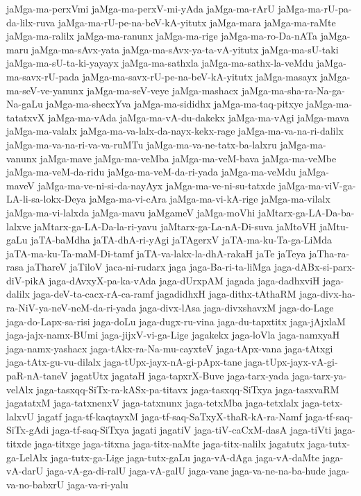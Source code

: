 {jaMga-ma-perxVmi
jaMga-ma-perxV-mi-yAda
jaMga-ma-rArU
jaMga-ma-rU-pa-da-lilx-ruva
jaMga-ma-rU-pe-na-beV-kA-yitutx
jaMga-mara
jaMga-ma-raMte
jaMga-ma-ralilx
jaMga-ma-ranunx
jaMga-ma-rige
jaMga-ma-ro-Da-nATa
jaMga-maru
jaMga-ma-sAvx-yata
jaMga-ma-sAvx-ya-ta-vA-yitutx
jaMga-ma-sU-taki
jaMga-ma-sU-ta-ki-yayayx
jaMga-ma-sathxla
jaMga-ma-sathx-la-veMdu
jaMga-ma-savx-rU-pada
jaMga-ma-savx-rU-pe-na-beV-kA-yitutx
jaMga-masayx
jaMga-ma-seV-ve-yanunx
jaMga-ma-seV-veye
jaMga-mashacx
jaMga-ma-sha-ra-Na-ga-Na-gaLu
jaMga-ma-shecxYva
jaMga-ma-sididhx
jaMga-ma-taq-pitxye
jaMga-ma-tatatxvX
jaMga-ma-vAda
jaMga-ma-vA-du-dakekx
jaMga-ma-vAgi
jaMga-mava
jaMga-ma-valalx
jaMga-ma-va-lalx-da-nayx-kekx-rage
jaMga-ma-va-na-ri-dalilx
jaMga-ma-va-na-ri-va-va-ruMTu
jaMga-ma-va-ne-tatx-ba-lalxru
jaMga-ma-vanunx
jaMga-mave
jaMga-ma-veMba
jaMga-ma-veM-bava
jaMga-ma-veMbe
jaMga-ma-veM-da-ridu
jaMga-ma-veM-da-ri-yada
jaMga-ma-veMdu
jaMga-maveV
jaMga-ma-ve-ni-si-da-nayAyx
jaMga-ma-ve-ni-su-tatxde
jaMga-ma-viV-ga-LA-li-sa-lokx-Deya
jaMga-ma-vi-cAra
jaMga-ma-vi-kA-rige
jaMga-ma-vilalx
jaMga-ma-vi-lalxda
jaMga-mavu
jaMgameV
jaMga-moVhi
jaMtarx-ga-LA-Da-ba-lalxve
jaMtarx-ga-LA-Da-la-ri-yavu
jaMtarx-ga-La-nA-Di-suva
jaMtoVH
jaMtu-gaLu
jaTA-baMdha
jaTA-dhA-ri-yAgi
jaTAgerxV
jaTA-ma-ku-Ta-ga-LiMda
jaTA-ma-ku-Ta-maM-Di-tamf
jaTA-va-lakx-la-dhA-rakaH
jaTe
jaTeya
jaTha-ra-rasa
jaThareV
jaTiloV
jaca-ni-rudarx
jaga
jaga-Ba-ri-ta-liMga
jaga-dABx-si-parx-diV-pikA
jaga-dAvxyX-pa-ka-vAda
jaga-dUrxpAM
jagada
jaga-dadhxviH
jaga-dalilx
jaga-deV-ta-cacx-rA-ca-ramf
jagadidhxH
jaga-dithx-tAthaRM
jaga-divx-ha-ra-NiV-ya-neV-neM-da-ri-yada
jaga-divx-lAsa
jaga-divxshavxM
jaga-do-Lage
jaga-do-Lapx-sa-risi
jaga-doLu
jaga-dugx-ru-vina
jaga-du-tapxtitx
jaga-jAjxlaM
jaga-jajx-namx-BUmi
jaga-jijxV-vi-ga-Lige
jagakekx
jaga-loVla
jaga-namxyaH
jaga-namx-yashacx
jaga-tAkx-ra-Na-mu-cayxteV
jaga-tApx-vana
jaga-tAtxgi
jaga-tAtx-gu-vu-dilalx
jaga-tUpx-jayx-nA-gi-pApx-tane
jaga-tUpx-jayx-vA-gi-paR-nA-taneV
jagatUtx
jagataH
jaga-tapxrX-Buve
jaga-tarx-yada
jaga-tarx-ya-velAlx
jaga-tasxqq-SiTx-ra-kASx-pa-titavx
jaga-tasxqq-SiTxya
jaga-tasxvaRM
jagatatxM
jaga-tatxnenxV
jaga-tatxnunx
jaga-tetxMba
jaga-tetxlalx
jaga-tetx-lalxvU
jagatf
jaga-tf-kaqtayxM
jaga-tf-saq-SaTxyX-thaR-kA-ra-Namf
jaga-tf-saq-SiTx-gAdi
jaga-tf-saq-SiTxya
jagati
jagatiV
jaga-tiV-caCxM-dasA
jaga-tiVti
jaga-titxde
jaga-titxge
jaga-titxna
jaga-titx-naMte
jaga-titx-nalilx
jagatutx
jaga-tutx-ga-LelAlx
jaga-tutx-ga-Lige
jaga-tutx-gaLu
jaga-vA-dAga
jaga-vA-daMte
jaga-vA-darU
jaga-vA-ga-di-ralU
jaga-vA-galU
jaga-vane
jaga-va-ne-na-ba-hude
jaga-va-no-babxrU
jaga-va-ri-yalu
}
